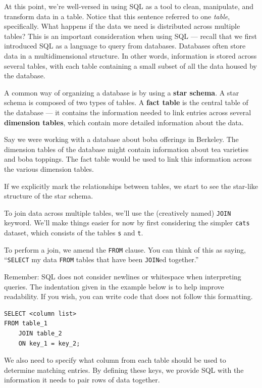 \documentclass[
  letterpaper,
  DIV=11,
  numbers=noendperiod]{scrreprt}
\begin{document}
At this point, we're well-versed in using SQL as a tool to clean,
manipulate, and transform data in a table. Notice that this sentence
referred to one \emph{table}, specifically. What happens if the data we
need is distributed across multiple tables? This is an important
consideration when using SQL --- recall that we first introduced SQL as
a language to query from databases. Databases often store data in a
multidimensional structure. In other words, information is stored across
several tables, with each table containing a small subset of all the
data housed by the database.

A common way of organizing a database is by using a \textbf{star
schema}. A star schema is composed of two types of tables. A
\textbf{fact table} is the central table of the database --- it contains
the information needed to link entries across several \textbf{dimension
tables}, which contain more detailed information about the data.

Say we were working with a database about boba offerings in Berkeley.
The dimension tables of the database might contain information about tea
varieties and boba toppings. The fact table would be used to link this
information across the various dimension tables.

If we explicitly mark the relationships between tables, we start to see
the star-like structure of the star schema.

To join data across multiple tables, we'll use the (creatively named)
\texttt{JOIN} keyword. We'll make things easier for now by first
considering the simpler \texttt{cats} dataset, which consists of the
tables \texttt{s} and \texttt{t}.

To perform a join, we amend the \texttt{FROM} clause. You can think of
this as saying, ``\texttt{SELECT} my data \texttt{FROM} tables that have
been \texttt{JOIN}ed together.''

Remember: SQL does not consider newlines or whitespace when interpreting
queries. The indentation given in the example below is to help improve
readability. If you wish, you can write code that does not follow this
formatting.

\begin{verbatim}
SELECT <column list>
FROM table_1 
    JOIN table_2 
    ON key_1 = key_2;
\end{verbatim}

We also need to specify what column from each table should be used to
determine matching entries. By defining these keys, we provide SQL with
the information it needs to pair rows of data together.
\end{document}

